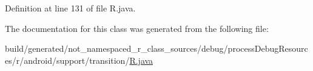 Definition at line 131 of file R.\+java.



The documentation for this class was generated from the following file\+:\begin{DoxyCompactItemize}
\item 
build/generated/not\+\_\+namespaced\+\_\+r\+\_\+class\+\_\+sources/debug/process\+Debug\+Resources/r/android/support/transition/\mbox{\hyperlink{android_2support_2transition_2_r_8java}{R.\+java}}\end{DoxyCompactItemize}
